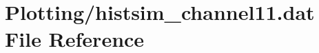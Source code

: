 \hypertarget{Plotting_2histsim__channel11_8dat}{}\section{Plotting/histsim\+\_\+channel11.dat File Reference}
\label{Plotting_2histsim__channel11_8dat}
